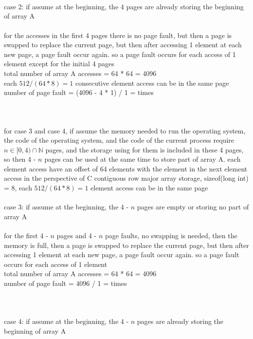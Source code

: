 \documentclass[12pt, border = 4pt, multi]{article} %
\begin{document}
\\
\\
\\
case 2: if assume at the beginning, the 4 pages are already storing the beginning of array A\\
\\
for the accesses in the first 4 pages there is no page fault, but then a page is swapped to replace the current page, but then after accessing 1 element at each new page, a page fault occur again. so a page fault occurs for each access of 1 element except for the initial 4 pages\\
total number of array A accesses = 64 * 64 = 4096\\
each $512 / (64 * 8) = 1$ consecutive element access can be in the same page\\
number of page fault = (4096 - 4 * 1) / 1 =  times\\
\\
\\
\\
for case 3 and case 4, if assume the memory needed to run the operating system, the code of the operating system, and the code of the current process require $n \in [0, 4) \cap \mathbb{N}$ pages, and the storage using for them is included in these 4 pages, so then 4 - $n$ pages can be used at the same time to store part of array A. each element access have an offset of 64 elements with the element in the next element access in the perspective of C contiguous row major array storage, sizeof(long int) = 8, each $512 / (64 * 8) = 1$ element access can be in the same page\\
\\
case 3: if assume at the beginning, the 4 - $n$ pages are empty or storing no part of array A\\
\\
for the first 4 - $n$ pages and 4 - $n$ page faults, no swapping is needed, then the memory is full, then a page is swapped to replace the current page, but then after accessing 1 element at each new page, a page fault occur again. so a page fault occurs for each access of 1 element\\
total number of array A accesses = 64 * 64 = 4096\\
number of page fault = 4096 / 1 =  times\\
\\
\\
\\
case 4: if assume at the beginning, the 4 - $n$ pages are already storing the beginning of array A\\
\end{document}
